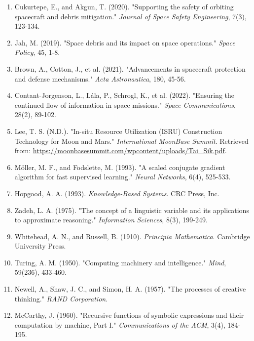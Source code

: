 \documentclass[a4paper,12pt]{article}
\begin{document}
\begin{enumerate}
    \item Cukurtepe, E., and Akgun, T. (2020). "Supporting the safety of orbiting spacecraft and debris mitigation." \textit{Journal of Space Safety Engineering}, 7(3), 123-134.

    \item Jah, M. (2019). "Space debris and its impact on space operations." \textit{Space Policy}, 45, 1-8.

    \item Brown, A., Cotton, J., et al. (2021). "Advancements in spacecraft protection and defense mechanisms." \textit{Acta Astronautica}, 180, 45-56.

    \item Contant-Jorgenson, L., Lála, P., Schrogl, K., et al. (2022). "Ensuring the continued flow of information in space missions." \textit{Space Communications}, 28(2), 89-102.

    \item Lee, T. S. (N.D.). "In-situ Resource Utilization (ISRU) Construction Technology for Moon and Mars." \textit{International MoonBase Summit}. Retrieved from: \url{https://moonbasesummit.com/wpcontent/uploads/Tai_Sik.pdf}.

    \item Möller, M. F., and Fodslette, M. (1993). "A scaled conjugate gradient algorithm for fast supervised learning." \textit{Neural Networks}, 6(4), 525-533.

    \item Hopgood, A. A. (1993). \textit{Knowledge-Based Systems}. CRC Press, Inc.

    \item Zadeh, L. A. (1975). "The concept of a linguistic variable and its applications to approximate reasoning." \textit{Information Sciences}, 8(3), 199-249.

    \item Whitehead, A. N., and Russell, B. (1910). \textit{Principia Mathematica}. Cambridge University Press.

    \item Turing, A. M. (1950). "Computing machinery and intelligence." \textit{Mind}, 59(236), 433-460.

    \item Newell, A., Shaw, J. C., and Simon, H. A. (1957). "The processes of creative thinking." \textit{RAND Corporation}.

    \item McCarthy, J. (1960). "Recursive functions of symbolic expressions and their computation by machine, Part I." \textit{Communications of the ACM}, 3(4), 184-195.


\end{enumerate}
\end{document}
